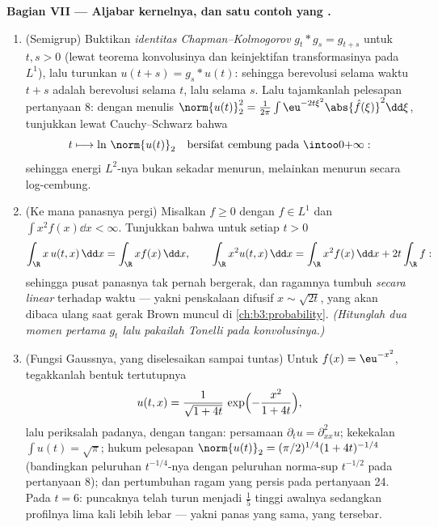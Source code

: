 \begin{problem}[{Soal akhir pekan --- $\partial_tu =
\partial^2_{xx}u$, yang diselesaikan sampai tuntas}]
\medskip
\noindent\textbf{Bagian VII --- Aljabar kernelnya, dan satu
contoh yang .}
\begin{enumerate}[resume]
  \item (Semigrup) Buktikan \emph{identitas
        Chapman--Kolmogorov} $g_t * g_s = g_{t+s}$ untuk $t, s > 0$ (lewat
        teorema konvolusinya dan keinjektifan transformasinya
        pada $L^1$), lalu turunkan $u(t + s) = g_s *
        u(t)$: sehingga berevolusi selama waktu $t + s$ adalah berevolusi selama $t$,
        lalu selama $s$. Lalu tajamkanlah pelesapan pertanyaan 8:
        dengan menulis $\norm{u(t)}_2^2 = \frac1{2\pi}\int
        \eu^{-2t\xi^2}\abs{\hat f(\xi)}^2\dd\xi$, tunjukkan lewat
        Cauchy--Schwarz bahwa
        \[
        t \longmapsto \ln\,\norm{u(t)}_2
        \quad\text{bersifat cembung pada } \intoo0{+\infty} :
        \]
        sehingga energi $L^2$-nya bukan sekadar menurun, melainkan
        menurun secara log-cembung.
  \item (Ke mana panasnya pergi) Misalkan $f \geq 0$ dengan $f \in L^1$
        dan $\int x^2f(x)\dd x < \infty$. Tunjukkan bahwa untuk setiap
        $t > 0$
        \[
        \int_\R x\,u(t, x)\,\dd x = \int_\R x f(x)\,\dd x,
        \qquad
        \int_\R x^2u(t, x)\,\dd x
        = \int_\R x^2f(x)\,\dd x + 2t\int_\R f :
        \]
        sehingga pusat panasnya tak pernah bergerak, dan ragamnya
        tumbuh \emph{secara linear} terhadap waktu --- yakni penskalaan
        difusif $x \sim \sqrt{2t}$, yang akan dibaca ulang saat
        gerak Brown muncul di \cref{ch:b3:probability}.
        \emph{(Hitunglah dua momen pertama $g_t$ lalu pakailah
        Tonelli pada konvolusinya.)}
  \item (Fungsi Gaussnya, yang diselesaikan sampai tuntas) Untuk $f(x) =
        \eu^{-x^2}$, tegakkanlah bentuk tertutupnya
        \[
        u(t, x) = \frac1{\sqrt{1 + 4t}}\,
        \exp\Bigl(-\frac{x^2}{1 + 4t}\Bigr),
        \]
        lalu periksalah padanya, dengan tangan: persamaan $\partial_tu
        = \partial^2_{xx}u$; kekekalan $\int u(t) =
        \sqrt\pi$; hukum pelesapan $\norm{u(t)}_2 =
        (\pi/2)^{1/4}(1 + 4t)^{-1/4}$ (bandingkan peluruhan $t^{-1/4}$-nya
        dengan peluruhan norma-sup $t^{-1/2}$ pada pertanyaan
        8); dan pertumbuhan ragam yang persis pada pertanyaan 24. Pada
        $t = 6$: puncaknya telah turun menjadi $\frac15$ tinggi
        awalnya sedangkan profilnya lima kali lebih lebar
        --- yakni panas yang sama, yang tersebar.

\end{enumerate}
\end{problem}
